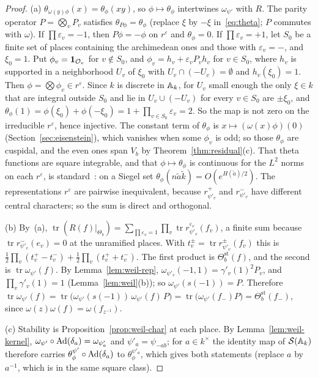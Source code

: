 \begin{proof}
(a) $\theta_{\omega(y)\phi}(x)=\theta_\phi(xy)$, so $\phi\mapsto
\theta_\phi$ intertwines $\omega_{\psi'}$ with $R$. The parity operator
$P=\bigotimes_vP_v$ satisfies $\theta_{P\phi}=\theta_\phi$ (replace $\xi$
by $-\xi$ in~\eqref{eq:theta}; $P$ commutes with $\omega$). If
$\prod\varepsilon_v=-1$, then $P\phi=-\phi$ on $r^\varepsilon$ and
$\theta_\phi=0$. If $\prod\varepsilon_v=+1$, let $S_0$ be a finite set of places
containing the archimedean ones and those with $\varepsilon_v=-$, and
$\xi_0=1$. Put $\phi_v=\mathbf 1_{\mathcal{O}_v}$ for $v\notin S_0$, and
$\phi_v=h_v+\varepsilon_vP_vh_v$ for $v\in S_0$, where $h_v$ is supported
in a neighborhood $U_v$ of $\xi_0$ with $U_v\cap(-U_v)=\emptyset$ and
$h_v(\xi_0)=1$. Then $\phi=\bigotimes\phi_v\in r^\varepsilon$. Since $k$ is
discrete in $\mathbb{A}_k$, for $U_v$ small enough the only $\xi\in k$ that are
integral outside $S_0$ and lie in $U_v\cup(-U_v)$ for every $v\in S_0$ are
$\pm\xi_0$, and $\theta_\phi(1)=\phi(\xi_0)+\phi(-\xi_0)=1+\prod_{v\in S_0}
\varepsilon_v=2$. So the map is not zero on the irreducible
$r^\varepsilon$, hence injective. The constant term of $\theta_\phi$ is
$x\mapsto(\omega(x)\phi)(0)$ (Section~\ref{sec:eisenstein}), which
vanishes when some $\phi_v$ is odd; so those $\theta_\phi$ are cuspidal,
and the even ones span $V_b$ by Theorem~\ref{thm:residual}(c). That theta
functions are square integrable, and that $\phi\mapsto\theta_\phi$ is
continuous for the $L^2$ norms on each $r^\varepsilon$, is
standard~\cite{We64,Ge76,GPS80}: on a Siegel set $\theta_\phi(n\tilde a
\tilde k)=O(e^{H(\tilde a)/2})$. The representations $r^\varepsilon$ are
pairwise inequivalent, because $r^+_{\psi'_v}$ and $r^-_{\psi'_v}$ have
different central characters; so the sum is direct and orthogonal.

(b) By~(a), $\operatorname{tr}(R(f)|_{\Theta_b})=\sum_{\prod\varepsilon_v=1}
\prod_v\operatorname{tr}r^{\varepsilon_v}_{\psi'_v}(f_v)$, a finite sum
because $\operatorname{tr}r^-_{\psi'_v}(e_v)=0$ at the unramified places.
With $t^\pm_v=\operatorname{tr}r^\pm_{\psi'_v}(f_v)$ this is
$\frac12\prod_v(t^+_v-t^-_v)+\frac12\prod_v(t^+_v+t^-_v)$. The first
product is $\Theta^{\mathrm{st}}_b(f)$, and the second is
$\operatorname{tr}\omega_{\psi'}(f)$. By Lemma~\ref{lem:weil-rep},
$\omega_{\psi'_v}(-1,1)=\gamma'_v(1)^2P_v$, and $\prod_v\gamma'_v(1)=1$
(Lemma~\ref{lem:weil}(b)); so $\omega_{\psi'}(s(-1))=P$. Therefore
$\operatorname{tr}\omega_{\psi'}(f)=\operatorname{tr}\bigl(\omega_{\psi'}(
s(-1))\,\omega_{\psi'}(f)\,P\bigr)=\operatorname{tr}\bigl(\omega_{\psi'}
(f_-)P\bigr)=\Theta^{\mathrm{st}}_b(f_-)$, since $\omega(z)\omega(f)=
\omega(f_{z^{-1}})$.

(c) Stability is Proposition~\ref{prop:weil-char} at each place. By
Lemma~\ref{lem:weil-kernel}, $\omega_{\psi'}\circ\operatorname{Ad}(\delta_a)=
\omega_{\psi'_a}$ and $\psi'_a=\psi_{-ab}$; for $a\in k^\times$ the
identity map of $\mathcal S(\mathbb{A}_k)$ therefore carries $\theta^{\psi'}_\phi
\circ\operatorname{Ad}(\delta_a)$ to $\theta^{\psi'_a}_\phi$, which gives
both statements (replace $a$ by $a^{-1}$, which is in the same square
class).
\end{proof}

